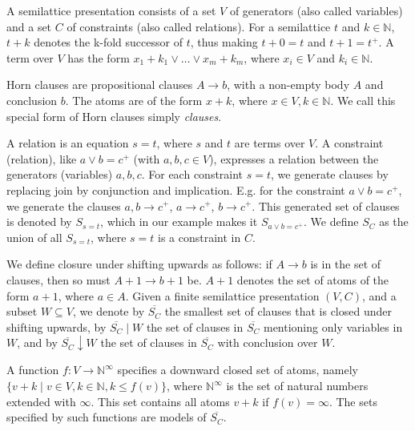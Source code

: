 A semilattice presentation consists of a set $V$ of generators
(also called variables) and a set $C$ of constraints
(also called relations).
For a semilattice $t$ and $k \in \mathbb{N}$, $t + k$ denotes the k-fold successor of $t$, thus making $t + 0 = t$ and $t + 1 = t^+$.
A term over $V$ has the form $x_1 + k_1 \lor \ldots \lor x_m + k_m$, where $x_i \in V$ and $k_i \in \mathbb{N}$.

Horn clauses are propositional clauses $A \rightarrow b$, with a non-empty body $A$ and conclusion $b$.
The atoms are of the form $x + k$, where $x \in V, k \in \mathbb{N}$.
We call this special form of Horn clauses simply \textit{clauses}.

A relation is an equation $s = t$, where $s$ and $t$ are terms over $V$.
A constraint (relation), like $a \lor b = c^+$ (with $a, b, c \in V$), expresses a relation between the generators (variables) $a, b, c$.
For each constraint $s = t$, we generate clauses by replacing join by conjunction and implication.
E.g. for the constraint $a \lor b = c^+$, we generate the clauses
$a, b \rightarrow c^+$, $a \rightarrow c^+$, $b \rightarrow c^+$.
This generated set of clauses is denoted by $S_{s=t}$, which in our example makes it $S_{a \lor b = c^+}$.
We define $S_C$ as the union of all $S_{s=t}$, where $s = t$ is a constraint in $C$.


We define closure under shifting upwards as follows:
if $A \rightarrow b$ is in the set of clauses, then so must $A + 1 \rightarrow b + 1$ be.
$A + 1$ denotes the set of atoms of the form $a + 1$, where $a \in A$.
Given a finite semilattice presentation $(V, C)$,
and a subset $W \subseteq V$, we denote by
$\overline{S_C}$ the smallest set of clauses that is closed under shifting upwards,
by $\overline{S_C} \mid W$ the set of clauses in $\overline{S_C}$
mentioning only variables in $W$, and by $\overline{S_C} \downarrow W$
the set of clauses in $\overline{S_C}$ with conclusion over $W$.

A function $f : V \rightarrow \mathbb{N}^{\infty}$ specifies a downward closed set of atoms,
namely $\{v + k \mid v \in V, k \in \mathbb{N}, k \le f(v)\}$,
where $\mathbb{N}^{\infty}$ is the set of natural numbers extended with $\infty$.
This set contains all atoms $v + k$ if $f(v) = \infty$.
The sets specified by such functions are models of $\overline{S_C}$.

